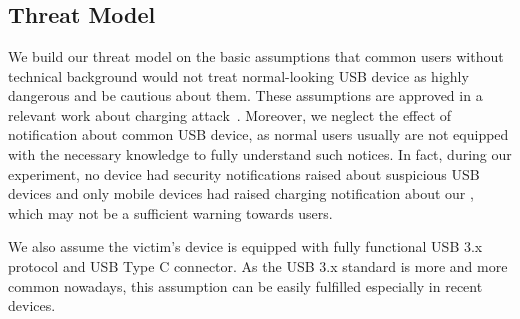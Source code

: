 \section{\tool}
\label{sec:badusb}
\subsection{Threat Model}

We build our threat model on the basic assumptions that common users without
technical background would not treat normal-looking USB device as highly
dangerous and be cautious about them. These assumptions are approved in a
relevant work about charging attack~\cite{JFCImpact}. Moreover, we neglect the
effect of notification about common USB device, as normal users usually are not
equipped with the necessary knowledge to fully understand such notices. In
fact, during our experiment, no device had security notifications raised about
suspicious USB devices and only mobile devices had raised charging notification
about our \tool, which may not be a sufficient warning towards users.

We also assume the victim's device is equipped with fully functional USB 3.x
protocol and USB Type C connector. As the USB 3.x standard is more and more
common nowadays, this assumption can be easily fulfilled especially in recent
devices.


